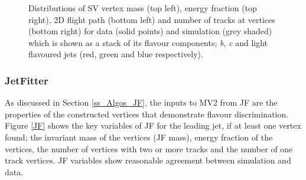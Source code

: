 \documentclass[12pt, onecolumn,notitlepage]{article}
\begin{document}
\begin{figure}[!htb]
	 \caption{Distributions of SV vertex mass (top left), energy fraction (top right), 2D flight path (bottom left) and number of tracks at vertices (bottom right)
           for data (solid points) and simulation (grey shaded) 
           which is shown as a stack of its flavour components; \textit{b}, \textit{c} and light flavoured jets (red, green and blue respectively).}
         \label{SV1}
         \vspace{-0.6cm}
\end{figure}

\subsubsection{JetFitter}

As discussed in Section \ref{ss_Algos_JF}, the inputs to MV2 from JF are the properties of the constructed vertices that demonstrate flavour discrimination.
Figure \ref{JF} shows the key variables of JF for the leading jet, if at least one vertex found;
the invariant mass of the vertices (JF mass), energy fraction of the vertices, the number of vertices with two or more tracks
and the number of one track vertices. JF variables show reasonable agreement between simulation and data.
\end{document}
